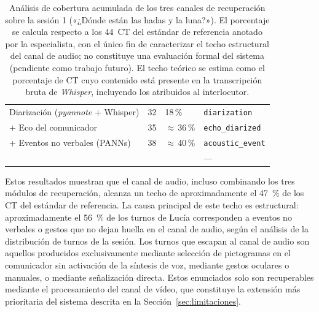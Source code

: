 \begin{table}[h]
  \footnotesize
  \renewcommand{\arraystretch}{1.3}
  \setlength{\tabcolsep}{4pt}
  \begin{center}
  \begin{tabular}{|L{5.5cm}|L{2cm}|L{2cm}|L{3cm}|}
  \hline
   &  &  &  \\ \hline
  Diarización (\emph{pyannote} + Whisper)  & 32 & 18\,\% & \texttt{diarization} \\ \hline
  + Eco del comunicador                    & 35 & $\approx$\,36\,\%  & \texttt{echo\_diarized} \\ \hline
  + Eventos no verbales (PANNs)            & 38 & $\approx$\,40\,\%  & \texttt{acoustic\_event} \\ \hline
            & \bft{---} &  & --- \\ \hline
  \end{tabular}
  \end{center}
  \caption[Cobertura por canal de recuperación]{Análisis de cobertura acumulada de los
    tres canales de recuperación sobre la sesión 1 («¿Dónde están las hadas y la luna?»).
    El porcentaje se calcula respecto a los 44~\ac{CT} del estándar de referencia anotado
    por la especialista, con el único fin de caracterizar el techo estructural del canal de
    audio; no constituye una evaluación formal del sistema (pendiente como trabajo futuro).
    El techo teórico se estima como el porcentaje de \ac{CT} cuyo contenido está presente
    en la transcripción bruta de \emph{Whisper}, incluyendo los atribuidos al interlocutor.}
  \label{tab:recall_canales}
\end{table}

Estos resultados muestran que el canal de audio, incluso combinando los tres módulos de
recuperación, alcanza un techo de aproximadamente el 47~\% de los \ac{CT} del estándar
de referencia. La causa principal de este techo es estructural: aproximadamente el
56~\% de los turnos de Lucía corresponden a eventos no verbales o gestos que no dejan
huella en el canal de audio, según el análisis de la distribución de turnos de la
sesión. Los turnos que escapan al canal de audio son aquellos producidos exclusivamente
mediante selección de pictogramas en el comunicador sin activación de la síntesis de
voz, mediante gestos oculares o manuales, o mediante señalización directa. Estos
enunciados solo son recuperables mediante el procesamiento del canal de vídeo, que
constituye la extensión más prioritaria del sistema descrita en la
Sección~\ref{sec:limitaciones}.


